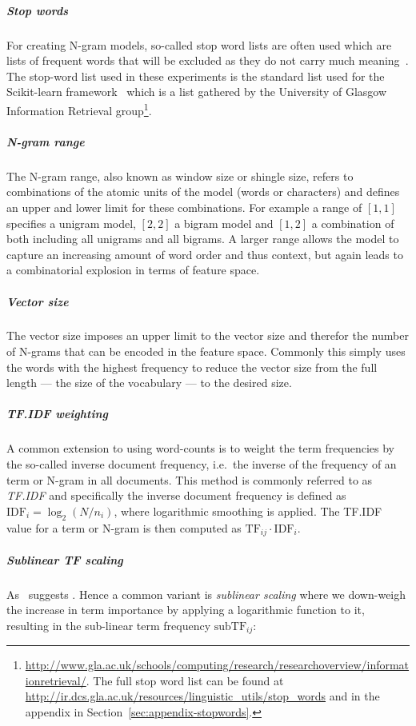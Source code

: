 \subparagraph{Stop words}
\label{subp:Stop words}
For creating N-gram models, so-called stop word lists are often used which are lists of frequent words that will be excluded as they do not carry much meaning~\cite[Chapter 1.3.1, p.~7]{Leskovec:2014aa}. The stop-word list used in these experiments is the standard list used for the Scikit-learn framework~\cite{Pedregosa:2011aa} which is a list gathered by the University of Glasgow Information Retrieval group\footnote{\url{http://www.gla.ac.uk/schools/computing/research/researchoverview/informationretrieval/}. The full stop word list can be found at \url{http://ir.dcs.gla.ac.uk/resources/linguistic_utils/stop_words} and in the appendix in Section~\ref{sec:appendix-stopwords}.}.

\subparagraph{N-gram range} The N-gram range, also known as window size or shingle size, refers to combinations of the atomic units of the model (words or characters) and defines an upper and lower limit for these combinations. For example a range of $[1,1]$ specifies a unigram model, $[2,2]$ a bigram model and $[1,2]$ a combination of both including all unigrams and all bigrams.
A larger range allows the model to capture an increasing amount of word order and thus context, but again leads to a combinatorial explosion in terms of feature space.

\subparagraph{Vector size} The vector size imposes an upper limit to the vector size and therefor the number of N-grams that can be encoded in the feature space. Commonly this simply uses the words with the highest frequency to reduce the vector size from the full length --- the size of the vocabulary --- to the desired size.

\subparagraph{TF.IDF weighting}
\label{subp:TF.IDF weighting}
A common extension to using word-counts is to weight the term frequencies by the so-called inverse document frequency, i.e.\ the inverse of the frequency of an term or N-gram in all documents. This method is commonly referred to as \emph{TF.IDF} and specifically the inverse document frequency is defined as $\text{IDF}_i = \log_2 (N/n_i)$, where logarithmic smoothing is applied. The TF.IDF value for a term or N-gram is then computed as $\text{TF}_{ij} \cdot \text{IDF}_i$.

\subparagraph{Sublinear TF scaling}
\label{subp:Sublinear TF scaling}
 As~\cite[Chapter 6.4.1, p.~126]{Manning:2008aa} suggests . Hence a common variant is \emph{sublinear scaling} where we down-weigh the increase in term importance by applying a logarithmic function to it, resulting in the sub-linear term frequency $\text{subTF}_{ij}$:

